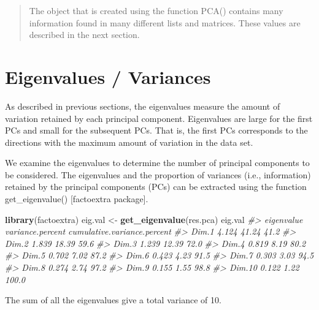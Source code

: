 \documentclass[]{book}
\newenvironment{Shaded}{\begin{snugshade}}{\end{snugshade}}
\newcommand{\CommentTok}[1]{\textcolor[rgb]{0.56,0.35,0.01}{\textit{#1}}}
\newcommand{\KeywordTok}[1]{\textcolor[rgb]{0.13,0.29,0.53}{\textbf{#1}}}
\newcommand{\NormalTok}[1]{#1}
\newcommand{\StringTok}[1]{\textcolor[rgb]{0.31,0.60,0.02}{#1}}
\begin{document}
\begin{quote}
The object that is created using the function PCA() contains many information found in many different lists and matrices. These values are described in the next section.
\end{quote}

\hypertarget{eigenvalues-variances}{%
\section{Eigenvalues / Variances}\label{eigenvalues-variances}}

As described in previous sections, the eigenvalues measure the amount of variation retained by each principal component. Eigenvalues are large for the first PCs and small for the subsequent PCs. That is, the first PCs corresponds to the directions with the maximum amount of variation in the data set.

We examine the eigenvalues to determine the number of principal components to be considered. The eigenvalues and the proportion of variances (i.e., information) retained by the principal components (PCs) can be extracted using the function get\_eigenvalue() {[}factoextra package{]}.

\begin{Shaded}
\begin{Highlighting}[]
\KeywordTok{library}\NormalTok{(factoextra)}
\NormalTok{eig.val <-}\StringTok{ }\KeywordTok{get_eigenvalue}\NormalTok{(res.pca)}
\NormalTok{eig.val}
\CommentTok{#>        eigenvalue variance.percent cumulative.variance.percent}
\CommentTok{#> Dim.1       4.124            41.24                        41.2}
\CommentTok{#> Dim.2       1.839            18.39                        59.6}
\CommentTok{#> Dim.3       1.239            12.39                        72.0}
\CommentTok{#> Dim.4       0.819             8.19                        80.2}
\CommentTok{#> Dim.5       0.702             7.02                        87.2}
\CommentTok{#> Dim.6       0.423             4.23                        91.5}
\CommentTok{#> Dim.7       0.303             3.03                        94.5}
\CommentTok{#> Dim.8       0.274             2.74                        97.2}
\CommentTok{#> Dim.9       0.155             1.55                        98.8}
\CommentTok{#> Dim.10      0.122             1.22                       100.0}
\end{Highlighting}
\end{Shaded}

The sum of all the eigenvalues give a total variance of 10.
\end{document}
